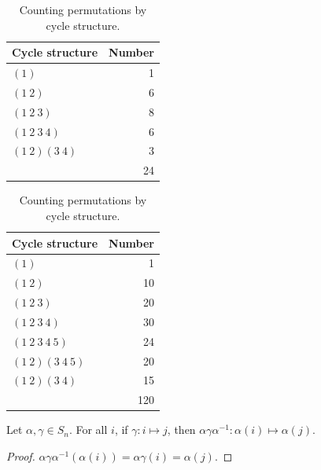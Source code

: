 \begin{table}[H]
	\centering
	\begin{minipage}{0.42\linewidth}
		\centering
		\begin{tabular}{lr}
			\toprule
			Cycle structure & Number \\
			\midrule
			\((1)\)          & 1  \\
			\((1\ 2)\)       & 6  \\
			\((1\ 2\ 3)\)    & 8  \\
			\((1\ 2\ 3\ 4)\) & 6  \\
			\((1\ 2)(3\ 4)\) & 3  \\
			\midrule
			                 & 24 \\
			\bottomrule
		\end{tabular}
	\end{minipage}
	\hfill
	\begin{minipage}{0.52\linewidth}
		\centering
		\begin{tabular}{lr}
			\toprule
			Cycle structure     & Number \\
			\midrule
			\((1)\)               & 1   \\
			\((1\ 2)\)            & 10  \\
			\((1\ 2\ 3)\)         & 20  \\
			\((1\ 2\ 3\ 4)\)      & 30  \\
			\((1\ 2\ 3\ 4\ 5)\)   & 24  \\
			\((1\ 2)(3\ 4\ 5)\)   & 20  \\
			\((1\ 2)(3\ 4)\)      & 15  \\
			\midrule
			                      & 120 \\
			\bottomrule
		\end{tabular}
	\end{minipage}
	\caption{Counting permutations by cycle structure.}
	\label{tab:cycle-counts}
\end{table}

\begin{lemma}\label{lem:conj-action}
	Let \(\alpha, \gamma \in S_n\). For all \(i\), if \(\gamma\colon i \mapsto j\), then
	\(\alpha\gamma\alpha^{-1}\colon \alpha(i) \mapsto \alpha(j)\).
\end{lemma}

\begin{proof}
	\(\alpha\gamma\alpha^{-1}(\alpha(i)) = \alpha\gamma(i) = \alpha(j)\).
\end{proof}

